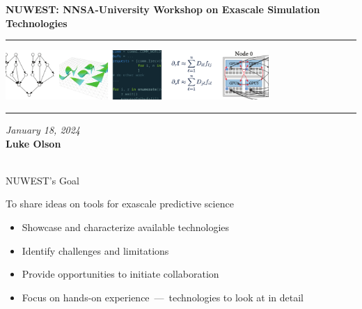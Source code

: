 \documentclass[aspectratio=169]{beamer}
\begin{document}
\begin{frame}\frametitle{}

\vspace*{0.2in}

\hspace*{0.0in}\textrm{{\huge\bfseries\color{IllinoisOrange} NUWEST: NNSA-University Workshop on Exascale Simulation Technologies}}

\vspace*{0.2in}
\hrule
\begin{center}
\includegraphics[width=0.75\textwidth]{./media/coverart-cs.pdf}
\end{center}
\hrule

\vspace*{0.1in}
\noindent\textit{January 18, 2024}\\
\vspace*{0.1in}
\noindent\textbf{\color{IllinoisOrange}Luke Olson}\\
\\

\end{frame}

\begin{frame}{NUWEST's Goal}
\begin{center}
\begin{tcolorbox}[colframe=IllinoisOrange]
To share ideas on tools for exascale predictive science
\end{tcolorbox}
\end{center}
\begin{itemize}
\item Showcase and characterize available technologies
\item Identify challenges and limitations
\item Provide opportunities to initiate collaboration
\item Focus on \alert{hands-on experience}~---~technologies to look at in detail
\end{itemize}
\end{frame}
\end{document}
